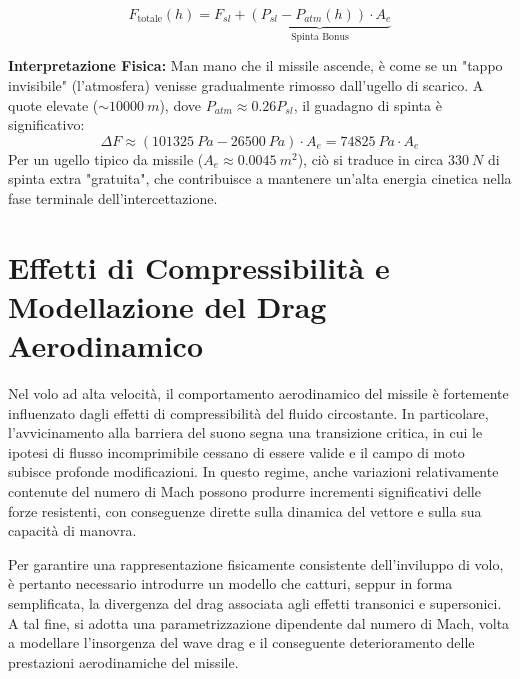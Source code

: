 \documentclass[12pt,a4paper]{article}
\begin{document}
\begin{equation}
    F_{\text{totale}}(h) = F_{sl} + \underbrace{(P_{sl} - P_{atm}(h)) \cdot A_e}_{\text{Spinta Bonus}}
\end{equation}

\textbf{Interpretazione Fisica:} Man mano che il missile ascende, è come se un "tappo invisibile" (l'atmosfera) venisse gradualmente rimosso dall'ugello di scarico.
A quote elevate ($\sim \SI{10000}{m}$), dove $P_{atm} \approx 0.26 P_{sl}$, il guadagno di spinta è significativo:
\begin{equation}
    \Delta F \approx (\SI{101325}{Pa} - \SI{26500}{Pa}) \cdot A_e = \SI{74825}{Pa} \cdot A_e
\end{equation}
Per un ugello tipico da missile ($A_e \approx \SI{0.0045}{m^2}$), ciò si traduce in circa $\SI{330}{N}$ di spinta extra "gratuita", che contribuisce a mantenere un'alta energia cinetica nella fase terminale dell'intercettazione.

\section{Effetti di Compressibilità e Modellazione del Drag Aerodinamico}

Nel volo ad alta velocità, il comportamento aerodinamico del missile è fortemente influenzato dagli effetti di compressibilità del fluido circostante. In particolare, l’avvicinamento alla barriera del suono segna una transizione critica, in cui le ipotesi di flusso incomprimibile cessano di essere valide e il campo di moto subisce profonde modificazioni. In questo regime, anche variazioni relativamente contenute del numero di Mach possono produrre incrementi significativi delle forze resistenti, con conseguenze dirette sulla dinamica del vettore e sulla sua capacità di manovra.

Per garantire una rappresentazione fisicamente consistente dell’inviluppo di volo, è pertanto necessario introdurre un modello che catturi, seppur in forma semplificata, la divergenza del drag associata agli effetti transonici e supersonici. A tal fine, si adotta una parametrizzazione dipendente dal numero di Mach, volta a modellare l’insorgenza del wave drag e il conseguente deterioramento delle prestazioni aerodinamiche del missile.

\end{document}
